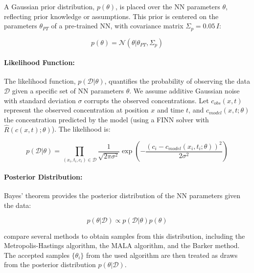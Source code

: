 \documentclass{article}
\begin{document}
A Gaussian prior distribution, $p(\theta)$, is placed over the NN parameters $\theta$, reflecting prior knowledge or assumptions. This prior is centered on the parameters $\theta_{PT}$ of a pre-trained NN, with covariance matrix $\Sigma_p = 0.05 \, I$:


\begin{equation*}
p(\theta) = \mathcal{N}(\theta | \theta_{PT}, \Sigma_p)
\end{equation*}

\paragraph{Likelihood Function:}

The likelihood function, $p(\mathcal{D} | \theta)$, quantifies the probability of observing the data $\mathcal{D}$ given a specific set of NN parameters $\theta$. We assume additive Gaussian noise with standard deviation $\sigma$ corrupts the observed concentrations. Let $c_{obs}(x,t)$ represent the observed concentration at position $x$ and time $t$, and $c_{model}(x,t; \theta)$ the concentration predicted by the model (using a FINN solver with $\hat{R}(c(x,t);\theta)$). The likelihood is:

\begin{equation}
p(\mathcal{D} | \theta) = \prod_{(x_i, t_i, c_i) \in \mathcal{D}} \frac{1}{\sqrt{2\pi \sigma^2}} \exp \left( -\frac{(c_i - c_{model}(x_i, t_i; \theta))^2}{2\sigma^2} \right)
\label{eq:likelihood}
\end{equation}

\paragraph{Posterior Distribution:}

Bayes' theorem provides the posterior distribution of the NN parameters given the data:

\begin{equation*}
p(\theta | \mathcal{D}) \propto p(\mathcal{D} | \theta) p(\theta)
\end{equation*}

\textcite{finn} compare several methods to obtain samples from this distribution, including the Metropolis-Hastings algorithm, the MALA algorithm, and the Barker method. The accepted samples $\{\theta_i\}$ from the used algorithm are then treated as draws from the posterior distribution $p(\theta | \mathcal{D})$.
\end{document}
